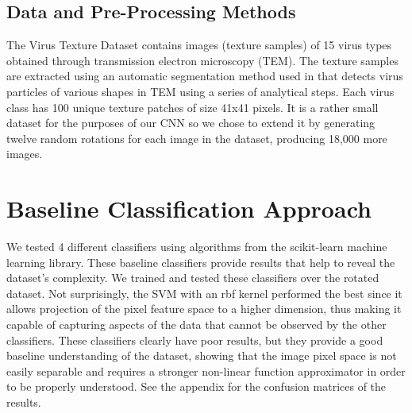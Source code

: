 \begin{multicols}{2}
\subsection{Data and Pre-Processing Methods}
\label{text:dataset}
The Virus Texture Dataset contains images (texture samples) of 15 virus types obtained through transmission electron microscopy (TEM). The texture samples are extracted using an automatic segmentation method used in \citet{JMI:JMI3556} that detects virus particles of various shapes in TEM using a series of analytical steps. Each virus class has 100 unique texture patches of size 41x41 pixels. It is a rather small dataset for the purposes of our CNN so we chose to extend it by generating twelve random rotations for each image in the dataset, producing 18,000 more images.

\section{Baseline Classification Approach}
We tested 4 different classifiers using algorithms from the scikit-learn \citet{scikit-learn} machine learning library. These baseline classifiers provide results that help to reveal the dataset's complexity. We trained and tested these classifiers over the rotated dataset. Not surprisingly, the SVM with an rbf kernel performed the best since it allows projection of the pixel feature space to a higher dimension, thus making it capable of capturing aspects of the data that cannot be observed by the other classifiers. These classifiers clearly have poor results, but they provide a good baseline understanding of the dataset, showing that the image pixel space is not easily separable and requires a stronger non-linear function approximator in order to be properly understood. See the appendix for the confusion matrices of the results.


\begin{table}
\end{table}



\end{multicols}
